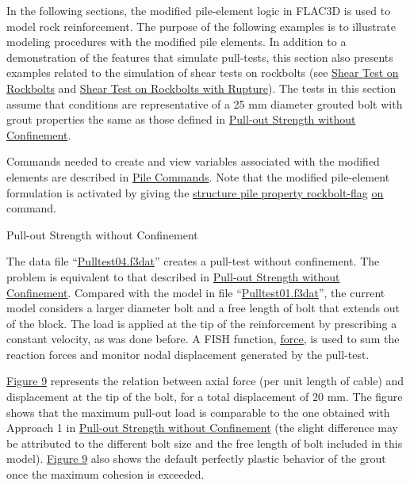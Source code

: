\documentclass[a4paper, nobind]{templates/ociamthesis}
\begin{document}
In the following sections, the modified pile-element logic in FLAC3D is
used to model rock reinforcement. The purpose of
the following examples is to illustrate modeling procedures with the
modified
pile elements. In addition to a demonstration of the features that
simulate
pull-tests, this section also presents examples related to the
simulation of
shear tests on rockbolts (see \protect\hyperlink{pulltest-shear-bolt-section}{Shear Test on
Rockbolts} and
\protect\hyperlink{pulltest-shear-rupture-section}{Shear
Test on Rockbolts with Rupture}). The
tests in this section assume
that conditions are representative of a 25 mm diameter grouted bolt with
grout
properties the same as those defined in \protect\hyperlink{pulltest-cable1-section}{Pull-out Strength without
Confinement}.

Commands needed to create and view variables associated with the
modified
elements are described in \href{../../../../sel/doc/manual/sel_manual/piles/commands/pile_commands.html\#sel-pile-commands}{Pile
Commands}.
Note that the modified pile-element formulation is
activated by giving the \href{../../../../sel/doc/manual/sel_manual/piles/commands/cmd_structure.pile.property.html\#kwd:structure.pile.property.rockbolt-flag}{structure
pile property
rockbolt-flag}
\href{../../../../../common/docproject/utilities/types.html\#type:str}{\underline{on}}
command.

Pull-out Strength without
Confinement

The data file ``\protect\hyperlink{pulltest04data}{Pulltest04.f3dat}'' creates a pull-test
without confinement. The problem is equivalent to that described in
\protect\hyperlink{pulltest-cable1-section}{Pull-out
Strength without Confinement}. Compared with
the model in file ``\protect\hyperlink{pulltest01data}{Pulltest01.f3dat}'', the current
model
considers a larger diameter bolt and a free length of bolt that extends
out of
the block. The load is applied at the tip of the reinforcement by
prescribing a
constant velocity, as was done before. A FISH
function,
\href{../../../../../common/docproject/utilities/types.html\#type:sym}{\underline{force}},
is used to sum the
reaction forces and monitor nodal displacement generated by the
pull-test.

\protect\hyperlink{pulltest-pile1}{Figure 9} represents the relation between axial
force (per unit length of cable) and displacement at the tip of the
bolt, for a
total displacement of 20 mm. The figure shows that the maximum pull-out
load is
comparable to the one obtained with Approach 1 in \protect\hyperlink{pulltest-cable1-section}{Pull-out Strength
without
Confinement} (the slight difference may be
attributed to the different
bolt size and the free length of bolt included in this model). \protect\hyperlink{pulltest-pile1}{Figure
9} also shows the default perfectly plastic
behavior of the grout once the maximum cohesion is exceeded.
\end{document}

